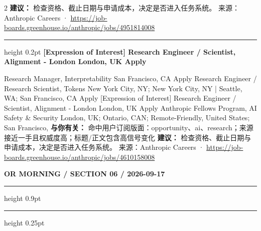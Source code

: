\documentclass[10.5pt]{ctexart}
\begin{document}
\begin{multicols}{2}
\textbf{建议：} 检查资格、截止日期与申请成本，决定是否进入任务系统。
{\footnotesize\color{ormuted} 来源：Anthropic Careers · \url{https://job-boards.greenhouse.io/anthropic/jobs/4951814008}}
\vspace{2mm}
\hrule height 0.2pt
\vspace{2mm}
{\large\bfseries [Expression of Interest] Research Engineer / Scientist, Alignment - London London, UK Apply}\par
[Expression of Interest] Research Manager, Interpretability San Francisco, CA Apply Research Engineer / Research Scientist, Tokens New York City, NY; New York City, NY | Seattle, WA; San Francisco, CA Apply [Expression of Interest] Research Engineer / Scientist, Alignment - London London, UK Apply Anthropic Fellows Program, AI Safety \& Security London, UK; Ontario, CAN; Remote-Friendly, United States; San Francisco, 
\textbf{与你有关：} 命中用户订阅版面：opportunity、ai、research；来源接近一手且权威度高；标题/正文包含高信号变化
\textbf{建议：} 检查资格、截止日期与申请成本，决定是否进入任务系统。
{\footnotesize\color{ormuted} 来源：Anthropic Careers · \url{https://job-boards.greenhouse.io/anthropic/jobs/4610158008}}
\end{multicols}
\newpage
{\small\bfseries OR MORNING / SECTION 06 / 2026-09-17}
\vspace{2mm}
\hrule height 0.9pt
\vspace{1.5mm}
\hrule height 0.25pt
\vspace{4mm}
\end{document}

